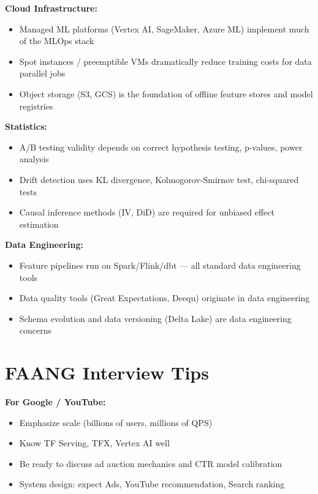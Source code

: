 \documentclass[11pt]{article}
\providecommand{\tightlist}{\setlength{\itemsep}{1pt}\setlength{\parskip}{0pt}}
\begin{document}
\textbf{Cloud Infrastructure:}

\begin{itemize}
\tightlist
\item
  Managed ML platforms (Vertex AI, SageMaker, Azure ML) implement much of the MLOps stack
\item
  Spot instances / preemptible VMs dramatically reduce training costs for data parallel jobs
\item
  Object storage (S3, GCS) is the foundation of offline feature stores and model registries
\end{itemize}

\textbf{Statistics:}

\begin{itemize}
\tightlist
\item
  A/B testing validity depends on correct hypothesis testing, p-values, power analysis
\item
  Drift detection uses KL divergence, Kolmogorov-Smirnov test, chi-squared tests
\item
  Causal inference methods (IV, DiD) are required for unbiased effect estimation
\end{itemize}

\textbf{Data Engineering:}

\begin{itemize}
\tightlist
\item
  Feature pipelines run on Spark/Flink/dbt --- all standard data engineering tools
\item
  Data quality tools (Great Expectations, Deequ) originate in data engineering
\item
  Schema evolution and data versioning (Delta Lake) are data engineering concerns
\end{itemize}

\section{FAANG Interview Tips}\label{faang-interview-tips}

\textbf{For Google / YouTube:}

\begin{itemize}
\tightlist
\item
  Emphasize scale (billions of users, millions of QPS)
\item
  Know TF Serving, TFX, Vertex AI well
\item
  Be ready to discuss ad auction mechanics and CTR model calibration
\item
  System design: expect Ads, YouTube recommendation, Search ranking
\end{itemize}
\end{document}
